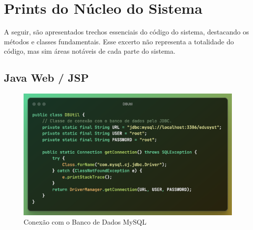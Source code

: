 \documentclass[main.tex]{subfiles}
\begin{document}
\section{Prints do Núcleo do Sistema}
A seguir, são apresentados trechos essenciais do código do sistema, destacando os métodos e classes fundamentais. Esse excerto não representa a totalidade do código, mas sim áreas notáveis de cada parte do sistema.

\subsection{Java Web / JSP}
\begin{figure}[H]
    \centering
    \includegraphics[scale=0.6]{imagens/code_scrs/2-db}
    \caption{Conexão com o Banco de Dados MySQL}
\end{figure}
\end{document}
